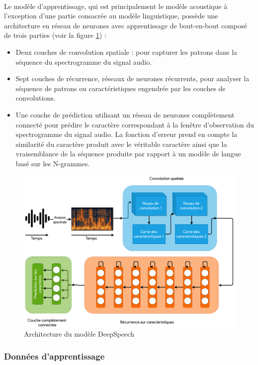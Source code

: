 		\paragraph{}
		Le modèle d'apprentissage, qui est principalement le modèle acoustique à l'exception d'une partie consacrée au modèle linguistique, possède une architecture en réseau de neurones avec apprentissage de bout-en-bout composé de trois parties (voir la figure \ref{fig:deepSpeechArch}) : 
		\begin{itemize}
			\item Deux couches de convolution spatiale : pour capturer les patrons dans la séquence du spectrogramme du signal audio.
			\item Sept couches de récurrence, réseaux de neurones récurrents, pour analyser la séquence de patrons ou caractéristiques engendrée par les couches de convolutions. 
			\item Une couche de prédiction utilisant un réseau de neurones complètement connecté pour prédire le caractère correspondant à la fenêtre d'observation du spectrogramme du signal audio. La fonction d'erreur prend en compte la similarité du caractère produit avec le véritable caractère ainsi que la vraisemblance de la séquence produite par rapport à un modèle de langue basé sur les N-grammes.
		\end{itemize}
		\begin{figure}[h] 
			\centering
			\includegraphics[width=0.88\linewidth]{images/Conception/ASR/deeps_speech_arch.png}
			\caption{Architecture du modèle DeepSpeech \citep{deepspeech_paper}}
			\label{fig:deepSpeechArch}
			
		\end{figure}
		\subsubsection*{Données d'apprentissage}
		\label{common_voice}

